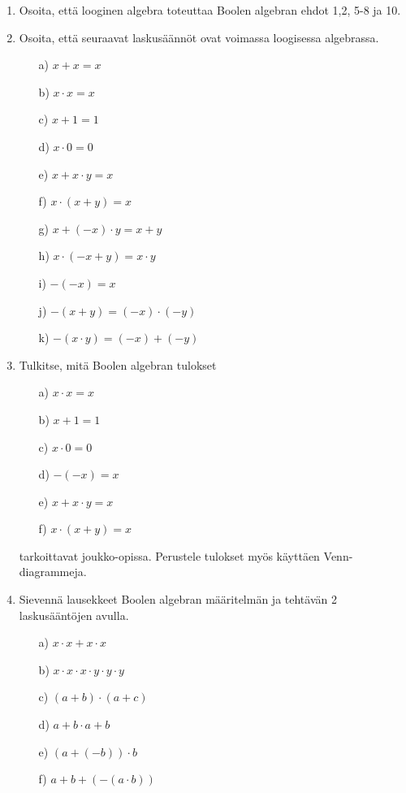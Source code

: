 \begin{enumerate}

\item Osoita, että looginen algebra toteuttaa Boolen algebran ehdot 1,2, 5-8 ja 10.

\item Osoita, että seuraavat laskusäännöt ovat voimassa loogisessa algebrassa.
\begin{itemize}
\item[a)] $x + x = x$
\item[b)] $x \cdot x = x$
\item[c)] $x + 1 = 1$
\item[d)] $x \cdot 0 = 0$
\item[e)] $x + x \cdot y = x$
\item[f)] $x \cdot (x + y) = x$
\item[g)] $x + (-x) \cdot y = x + y$
\item[h)] $x \cdot (-x + y) = x \cdot y$
\item[i)] $-(-x) = x$
\item[j)] $-(x + y) = (-x) \cdot (-y)$
\item[k)] $-(x \cdot y) = (-x) + (-y)$
\end{itemize}

\item
Tulkitse, mitä Boolen algebran tulokset
\begin{itemize}
\item[a)] $x \cdot x = x$
\item[b)] $x + 1 = 1$
\item[c)] $x \cdot 0 = 0$
\item[d)] $-(-x) = x$
\item[e)] $x + x \cdot y = x$
\item[f)] $x \cdot (x + y) = x$
\end{itemize}
tarkoittavat joukko-opissa. Perustele tulokset myös käyttäen Venn-diagrammeja.

\item
Sievennä lausekkeet Boolen algebran määritelmän ja tehtävän 2 laskusääntöjen avulla.
\begin{itemize}
\item[a)] $x \cdot x + x \cdot x$
\item[b)] $x \cdot x \cdot x \cdot y \cdot y \cdot y$
\item[c)] $(a + b) \cdot (a + c)$
\item[d)] $a + b \cdot a + b$
\item[e)] $(a + (-b)) \cdot b$
\item[f)] $a + b + (-(a \cdot b))$
\end{itemize}


\end{enumerate}
